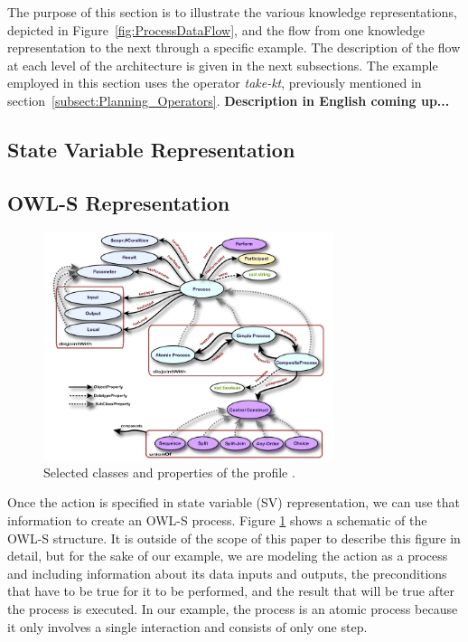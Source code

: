 The purpose of this section is to illustrate the various knowledge representations, depicted in Figure~\ref{fig:ProcessDataFlow}, and the flow from one knowledge representation to the next through a specific example. The description of the flow at each level of the architecture is given in the next subsections.
The example employed in this section uses the operator \textsl{take-kt}, previously mentioned in section~\ref{subsect:Planning_Operators}. \textbf{Description in English coming up...}

\subsection{State Variable Representation}


\subsection{OWL-S Representation}

\begin{figure}[htb]
\includegraphics[width=8.5cm]{images/OWL-S.jpg}
\caption{Selected classes and properties of the profile \cite{OWL-S}.}
\label{fig:OWL-S}
\end{figure}
Once the action is specified in state variable (SV) representation, we can use that information to create an OWL-S process. Figure \ref{fig:OWL-S} shows a schematic of the OWL-S structure. It is outside of the scope of this paper to describe this figure in detail, but for the sake of our example, we are modeling the action as a process and including information about its data inputs and outputs, the preconditions that have to be true for it to be performed, and the result that will be true after the process is executed. In our example, the process is an atomic process because it only involves a single interaction and consists of only one step.

